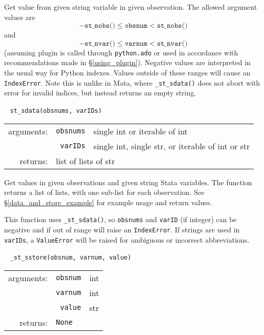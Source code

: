 \documentclass{article}
\begin{document}
			\vspace{1.5mm}
			\noindent Get value from given string variable in given observation. The allowed argument values are 
			\[
				-\texttt{st\_nobs()} \leq \texttt{obsnum} < \texttt{st\_nobs()}
			\]
			and
			\[
				-\texttt{st\_nvar()} \leq \texttt{varnum} < \texttt{st\_nvar()}
			\]
			(assuming plugin is called through \lstinline$python.ado$ or used in accordance with recommendations made in \S\ref{using_plugin}). Negative values are interpreted in the usual way for Python indexes. Values outside of these ranges will cause an \lstinline$IndexError$. Note this is unlike in Mata, where \lstinline{_st_sdata()} does not abort with error for invalid indices, but instead returns an empty string. \newline
			
			
			\ \newline
			\noindent \lstinline$st_sdata(obsnums, varIDs)$
								
			\vspace{1.5mm}
			\noindent 
			\indent \begin{tabular}{rrl}
					arguments: & \texttt{obsnums} & single int or iterable of int \\
						& \texttt{varIDs} & single int, single str, or iterable of int or str \\
					returns: & \multicolumn{2}{l}{list of lists of str}
				\end{tabular}
								
			\vspace{1.5mm}
			\noindent Get values in given observations and given string Stata variables. The function returns a list of lists, with one sub-list for each observation. See \S\ref{data_and_store_example} for example usage and return values. 
			
			This function uses \lstinline{_st_sdata()}, so \lstinline{obsnums} and \lstinline{varID} (if integer) can be negative and if out of range will raise an \lstinline{IndexError}. If strings are used in \lstinline{varIDs}, a \lstinline{ValueError} will be raised for ambiguous or incorrect abbreviations. \newline
			
			
			\ \newline
			\noindent \lstinline$_st_sstore(obsnum, varnum, value)$
								
			\vspace{1.5mm}
			\noindent 
			\indent \begin{tabular}{rrl}
					arguments: & \texttt{obsnum} & int \\
					  & \texttt{varnum} & int \\						
						& \texttt{value} & str \\
					returns: & \multicolumn{2}{l}{\texttt{None}}
				\end{tabular}
								
\end{document}
